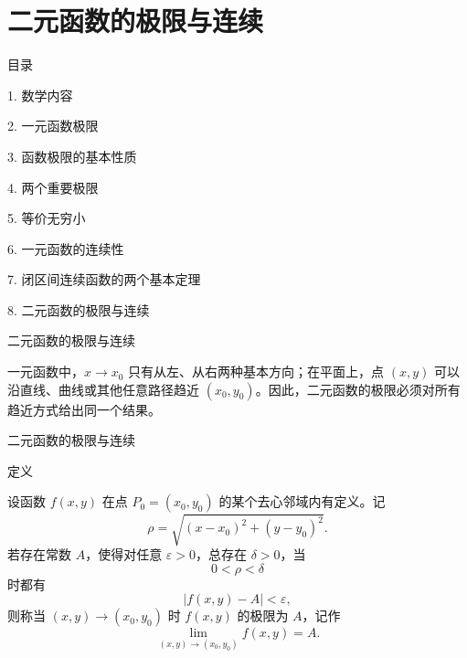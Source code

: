\documentclass[aspectratio=169,10pt,fontset=fandol]{ctexbeamer}
\begin{document}
\section{二元函数的极限与连续}
\begin{frame}[t,fragile]{目录}
\normalsize
{\color{black}\normalsize 1. 数学内容\par}\vspace{0.3em}
{\color{black}\normalsize 2. 一元函数极限\par}\vspace{0.3em}
{\color{black}\normalsize 3. 函数极限的基本性质\par}\vspace{0.3em}
{\color{black}\normalsize 4. 两个重要极限\par}\vspace{0.3em}
{\color{black}\normalsize 5. 等价无穷小\par}\vspace{0.3em}
{\color{black}\normalsize 6. 一元函数的连续性\par}\vspace{0.3em}
{\color{black}\normalsize 7. 闭区间连续函数的两个基本定理\par}\vspace{0.3em}
{\color{blue}\normalsize 8. 二元函数的极限与连续\par}\vspace{0.3em}
\end{frame}
\begin{frame}[t,fragile]{二元函数的极限与连续}
\normalsize
{\normalsize
一元函数中，\(x\to x_0\) 只有从左、从右两种基本方向；在平面上，点 \((x,y)\) 可以沿直线、曲线或其他任意路径趋近 \((x_0,y_0)\)。因此，二元函数的极限必须对所有趋近方式给出同一个结果。


}
\end{frame}
\begin{frame}[t,fragile]{二元函数的极限与连续}
\normalsize
\begin{block}{定义}
{\normalsize

	设函数 \(f(x,y)\) 在点 \(P_0=(x_0,y_0)\) 的某个去心邻域内有定义。记
	\[
	\rho=\sqrt{(x-x_0)^2+(y-y_0)^2}.
	\]
	若存在常数 \(A\)，使得对任意 \(\varepsilon>0\)，总存在 \(\delta>0\)，当
	\[
	0<\rho<\delta
	\]
	时都有
	\[
	|f(x,y)-A|<\varepsilon,
	\]
	则称当 \((x,y)\to(x_0,y_0)\) 时 \(f(x,y)\) 的极限为 \(A\)，记作
	\[
	\lim_{(x,y)\to(x_0,y_0)}f(x,y)=A.
	\]

}
\end{block}
\end{frame}
\end{document}
